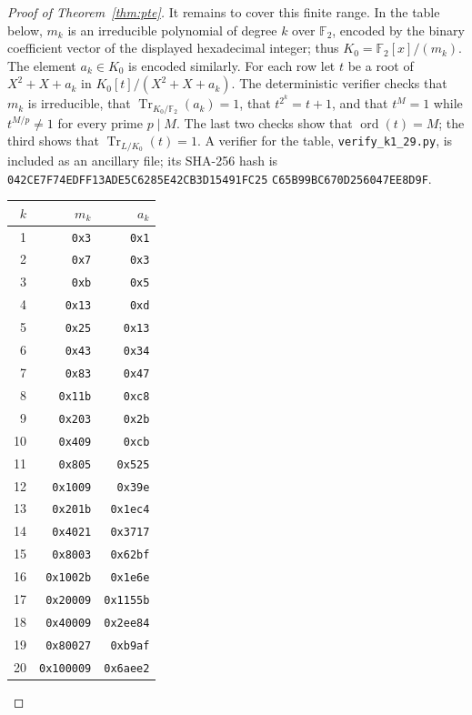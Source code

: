 \begin{proof}[Proof of Theorem~\ref{thm:pte}]
It remains to cover this finite range. In the table below, $m_k$ is an
irreducible polynomial of degree $k$ over $\mathbb F_2$, encoded by the
binary coefficient vector of the displayed hexadecimal integer; thus
$K_0=\mathbb F_2[x]/(m_k)$. The element $a_k\in K_0$ is encoded similarly.
For each row let $t$ be a root of $X^2+X+a_k$ in
$K_0[t]/(X^2+X+a_k)$. The deterministic verifier checks that $m_k$ is
irreducible, that $\operatorname{Tr}_{K_0/\mathbb F_2}(a_k)=1$, that
$t^{2^k}=t+1$, and that $t^M=1$ while $t^{M/p}\ne1$ for every prime
$p\mid M$. The last two checks show that $\operatorname{ord}(t)=M$; the
third shows that $\operatorname{Tr}_{L/K_0}(t)=1$. A verifier for the table, \texttt{verify\_k1\_29.py},
is included as an ancillary file; its SHA-256 hash is
\texttt{042CE7F74EDFF13ADE5C6285E42CB3D15491FC25}\allowbreak
\texttt{C65B99BC670D256047EE8D9F}.
\begin{center}
\small
\begin{tabular}{rrr}
$k$ & $m_k$ & $a_k$\\
\hline
1 & \texttt{0x3} & \texttt{0x1}\\
2 & \texttt{0x7} & \texttt{0x3}\\
3 & \texttt{0xb} & \texttt{0x5}\\
4 & \texttt{0x13} & \texttt{0xd}\\
5 & \texttt{0x25} & \texttt{0x13}\\
6 & \texttt{0x43} & \texttt{0x34}\\
7 & \texttt{0x83} & \texttt{0x47}\\
8 & \texttt{0x11b} & \texttt{0xc8}\\
9 & \texttt{0x203} & \texttt{0x2b}\\
10 & \texttt{0x409} & \texttt{0xcb}\\
11 & \texttt{0x805} & \texttt{0x525}\\
12 & \texttt{0x1009} & \texttt{0x39e}\\
13 & \texttt{0x201b} & \texttt{0x1ec4}\\
14 & \texttt{0x4021} & \texttt{0x3717}\\
15 & \texttt{0x8003} & \texttt{0x62bf}\\
16 & \texttt{0x1002b} & \texttt{0x1e6e}\\
17 & \texttt{0x20009} & \texttt{0x1155b}\\
18 & \texttt{0x40009} & \texttt{0x2ee84}\\
19 & \texttt{0x80027} & \texttt{0xb9af}\\
20 & \texttt{0x100009} & \texttt{0x6aee2}\\

\end{tabular}
\end{center}
\end{proof}
